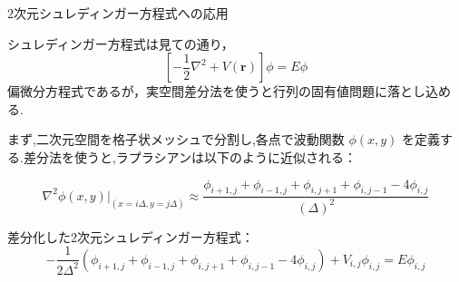 \documentclass{beamer}
\begin{document}
  \begin{frame}{2次元シュレディンガー方程式への応用}

    シュレディンガー方程式は見ての通り，
    $$
    \left[ -\frac{1}{2} \nabla^2 + V( \mathbf{r} ) \right] \phi = E \phi
    $$
    偏微分方程式であるが，実空間差分法を使うと行列の固有値問題に落とし込める.
    
    まず,二次元空間を格子状メッシュで分割し,各点で波動関数 $\phi(x,y)$ を定義する.差分法を使うと,ラプラシアンは以下のように近似される：
    
    $$
    \nabla^2 \phi(x,y)\big|_{(x=i\Delta,y=j \Delta)} 
    \approx \frac{\phi_{i+1,j} + \phi_{i-1,j} + \phi_{i,j+1} + \phi_{i,j-1} - 4\phi_{i,j}}{(\Delta )^2}
    $$
    
    差分化した2次元シュレディンガー方程式：
    $$
    -\frac{1}{2\Delta^2} (\phi_{i+1,j} + \phi_{i-1,j} + \phi_{i,j+1} + \phi_{i,j-1} - 4\phi_{i,j} ) + V_{i,j} \phi_{i,j} = E \phi_{i,j}
    $$
    \end{frame}
    
\end{document}
